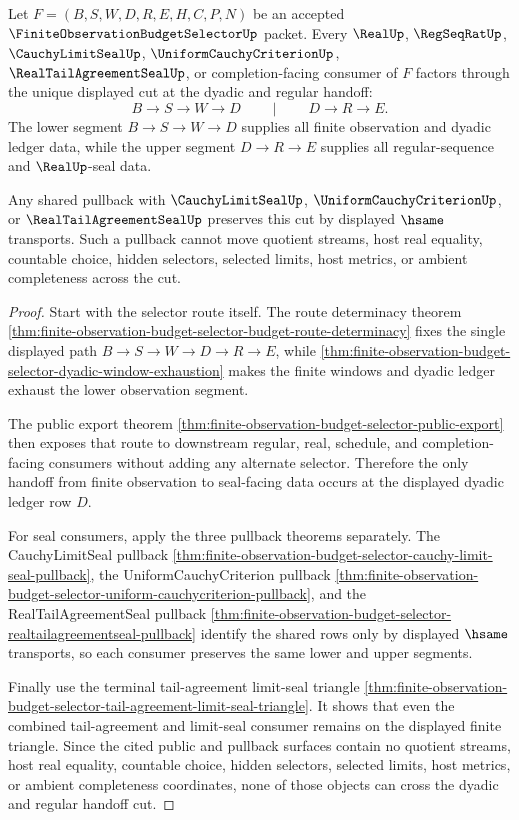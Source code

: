 \begin{theorem}
\label{thm:finite-observation-budget-selector-budget-seal-cut}
Let $F=(B,S,W,D,R,E,H,C,P,N)$ be an accepted $\FiniteObservationBudgetSelectorUp$ packet. Every $\RealUp$, $\RegSeqRatUp$, $\CauchyLimitSealUp$, $\UniformCauchyCriterionUp$, $\RealTailAgreementSealUp$, or completion-facing consumer of $F$ factors through the unique displayed cut at the dyadic and regular handoff:
$$
B \to S \to W \to D
\qquad\mid\qquad
D \to R \to E.
$$
The lower segment $B \to S \to W \to D$ supplies all finite observation and dyadic ledger data, while the upper segment $D \to R \to E$ supplies all regular-sequence and $\RealUp$-seal data.

Any shared pullback with $\CauchyLimitSealUp$, $\UniformCauchyCriterionUp$, or $\RealTailAgreementSealUp$ preserves this cut by displayed $\hsame$ transports. Such a pullback cannot move quotient streams, host real equality, countable choice, hidden selectors, selected limits, host metrics, or ambient completeness across the cut.
\end{theorem}
\begin{proof}
Start with the selector route itself. The route determinacy theorem \autoref{thm:finite-observation-budget-selector-budget-route-determinacy} fixes the single displayed path $B \to S \to W \to D \to R \to E$, while \autoref{thm:finite-observation-budget-selector-dyadic-window-exhaustion} makes the finite windows and dyadic ledger exhaust the lower observation segment.

The public export theorem \autoref{thm:finite-observation-budget-selector-public-export} then exposes that route to downstream regular, real, schedule, and completion-facing consumers without adding any alternate selector. Therefore the only handoff from finite observation to seal-facing data occurs at the displayed dyadic ledger row $D$.

For seal consumers, apply the three pullback theorems separately. The CauchyLimitSeal pullback \autoref{thm:finite-observation-budget-selector-cauchy-limit-seal-pullback}, the UniformCauchyCriterion pullback \autoref{thm:finite-observation-budget-selector-uniform-cauchycriterion-pullback}, and the RealTailAgreementSeal pullback \autoref{thm:finite-observation-budget-selector-realtailagreementseal-pullback} identify the shared rows only by displayed $\hsame$ transports, so each consumer preserves the same lower and upper segments.

Finally use the terminal tail-agreement limit-seal triangle \autoref{thm:finite-observation-budget-selector-tail-agreement-limit-seal-triangle}. It shows that even the combined tail-agreement and limit-seal consumer remains on the displayed finite triangle. Since the cited public and pullback surfaces contain no quotient streams, host real equality, countable choice, hidden selectors, selected limits, host metrics, or ambient completeness coordinates, none of those objects can cross the dyadic and regular handoff cut.
\end{proof}

